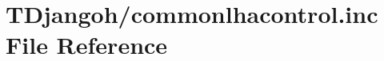 \hypertarget{commonlhacontrol_8inc}{\section{T\+Djangoh/commonlhacontrol.inc File Reference}
\label{commonlhacontrol_8inc}
}
